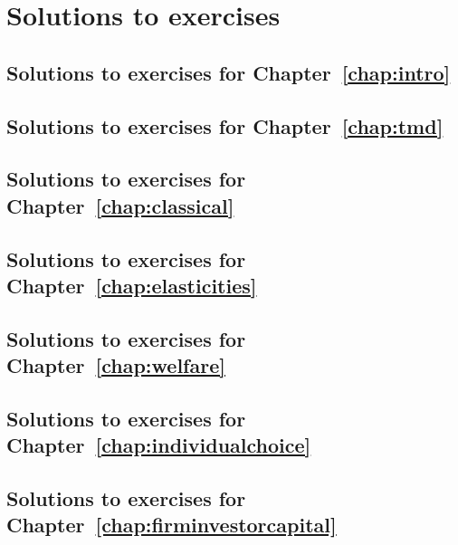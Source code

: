 	\chapter*{Solutions to exercises}
	
	\section*{Solutions to exercises for Chapter~\ref{chap:intro}}
	
	
	\newpage
	\section*{Solutions to exercises for Chapter~\ref{chap:tmd}}
	
	
	\newpage
	\section*{Solutions to exercises for Chapter~\ref{chap:classical}}
	
	
	\newpage
	\section*{Solutions to exercises for Chapter~\ref{chap:elasticities}}
	
	
	\newpage
	\section*{Solutions to exercises for Chapter~\ref{chap:welfare}}
	
	
	\newpage
	\section*{Solutions to exercises for Chapter~\ref{chap:individualchoice}}
	
	
	\newpage
	\section*{Solutions to exercises for Chapter~\ref{chap:firminvestorcapital}}
	
	
